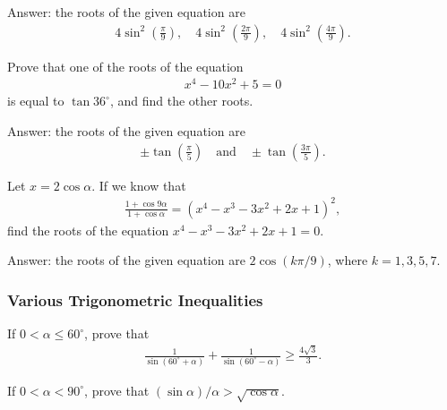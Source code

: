 \documentclass[12pt,a4paper]{memoir}
\theoremstyle{definition}
\begin{document}
\begin{solution}
	Answer: the roots of the given equation are
	\begin{align*}
		4\sin^2\left(\frac{\pi}{9}\right), \quad 4\sin^2\left(\frac{2\pi}{9}\right), \quad 4\sin^2\left(\frac{4\pi}{9}\right).
	\end{align*}
\end{solution}



\begin{question}
	Prove that one of the roots of the equation
	\begin{align*}
		x^4 - 10x^2 + 5 =0
	\end{align*}
	is equal to $\tan 36^\circ$, and find the other roots.
\end{question}

\begin{solution}
	Answer: the roots of the given equation are
	\begin{align*}
		\pm \tan\left(\frac{\pi}{5}\right) \quad \text{and} \quad \pm \tan\left(\frac{3\pi}{5}\right).
	\end{align*}
\end{solution}

\begin{question}
	Let $x=2\cos \alpha$. If we know that
	\begin{align*}
		\frac{1+\cos 9\alpha}{1+\cos \alpha} = (x^4-x^3-3x^2+2x+1)^2,
	\end{align*}
	find the roots of the equation $x^4-x^3-3x^2+2x+1=0$.
\end{question}

\begin{solution}
	Answer: the roots of the given equation are $2\cos(k\pi/9)$, where $k=1,3,5,7$.
\end{solution}

\subsubsection{Various Trigonometric Inequalities}


\begin{question}
	If $0<\alpha\leq 60^\circ$, prove that
	\begin{align*}
		\frac{1}{\sin(60^\circ + \alpha)}+\frac{1}{\sin(60^\circ - \alpha)} \geq \frac{4\sqrt 3}{3}.
	\end{align*}
\end{question}


\begin{question}
	If $0<\alpha<90^\circ$, prove that $(\sin \alpha)/\alpha > \sqrt{\cos \alpha}$.
\end{question}
\end{document}
